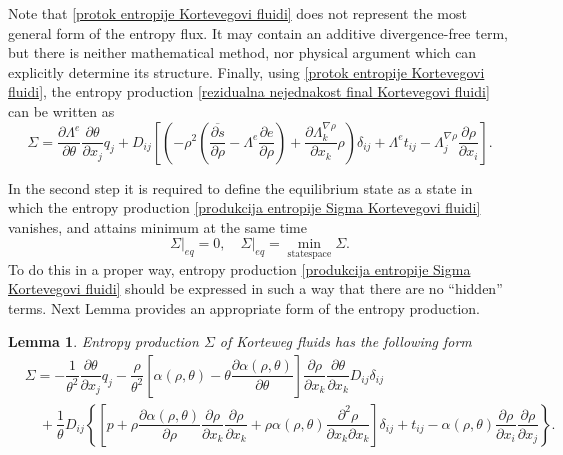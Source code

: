 \documentclass[a4paper,fleqn]{cas-sc}
\newtheorem{lemma}{Lemma}[section]
\theoremstyle{definition}
\begin{document}
Note that \eqref{protok entropije Kortevegovi fluidi} does not represent the most general form of the entropy flux. It may contain an additive divergence-free term, but there is neither mathematical method, nor physical argument which can explicitly determine its structure. Finally, using \eqref{protok entropije Kortevegovi fluidi}, the entropy production \eqref{rezidualna nejednakost final Kortevegovi fluidi} can be written as 
\begin{equation} \label{produkcija entropije Sigma Kortevegovi fluidi}
	\Sigma = \dfrac{\partial\Lambda^e}{\partial\theta} \dfrac{\partial\theta}{\partial x_j} q_j 
	+ D_{ij} \left[ \left( -\rho^2 \left( \overline{\dfrac{\partial s}{\partial\rho}} 
	- \Lambda^e \dfrac{\partial e}{\partial\rho}\right) 
	+ \dfrac{\partial\Lambda^{\nabla\rho}_k}{\partial x_k}\rho \right) \delta_{ij} 
	+ \Lambda^e t_{ij} - \Lambda^{\nabla\rho}_j \dfrac{\partial\rho}{\partial x_i} \right]. 
\end{equation}

In the second step it is required to define the equilibrium state as a state in which the entropy production \eqref{produkcija entropije Sigma Kortevegovi fluidi} vanishes, and attains minimum at the same time
\begin{equation} \label{ravnoteza Sigma Kortevegovi fluidi}
	\Sigma\big|_{eq} = 0, \quad \Sigma\big|_{eq} = \min_{\mathrm{state space}} \Sigma. 
\end{equation}
To do this in a proper way, entropy production \eqref{produkcija entropije Sigma Kortevegovi fluidi} should be expressed in such a way that there are no ``hidden'' terms. Next Lemma provides an appropriate form of the entropy production. 
\begin{lemma} \label{Lema:Produkcija entropije-konacna}
	Entropy production $\Sigma$ of Korteweg fluids has the following form
	\begin{align} \label{produkcija entropije Sigma Kortevegovi fluidi_konacna}
		& \Sigma = - \dfrac{1}{\theta^{2}} \dfrac{\partial\theta}{\partial x_j} q_j 
		- \dfrac{\rho}{\theta^{2}} \left[ \alpha(\rho, \theta) 
		- \theta \dfrac{\partial \alpha(\rho, \theta)}{\partial \theta} \right] 
		\dfrac{\partial \rho}{\partial x_k} \dfrac{\partial \theta}{\partial x_k} 
		D_{ij} \delta_{ij}
		\\ 
		& \quad + \dfrac{1}{\theta} D_{ij} \left\{ \left[ p 
		+ \rho \dfrac{\partial \alpha(\rho, \theta)}{\partial \rho}  
		\dfrac{\partial \rho}{\partial x_k} \dfrac{\partial \rho}{\partial x_k} 
		+ \rho \alpha(\rho, \theta) \dfrac{\partial^{2} \rho}{\partial x_k \partial x_k} \right] 
		\delta_{ij} + t_{ij} - \alpha(\rho, \theta) 
		\dfrac{\partial \rho}{\partial x_i} \dfrac{\partial \rho}{\partial x_j} \right\}. 
		\nonumber 
	\end{align}
\end{lemma} 
\end{document}
